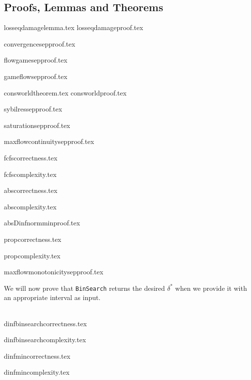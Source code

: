 \subsection{Proofs, Lemmas and Theorems}
  {losseqdamagelemma.tex}
  {losseqdamageproof.tex}

  {convergencesepproof.tex}

  {flowgamesepproof.tex}

  {gameflowsepproof.tex}

  {consworldtheorem.tex}
  {consworldproof.tex}

  {sybilressepproof.tex}

  {saturationsepproof.tex}

  {maxflowcontinuitysepproof.tex}

  {fcfscorrectness.tex}

  {fcfscomplexity.tex}

  {abscorrectness.tex}

  {abscomplexity.tex}

  {absDinfnormminproof.tex}

  {propcorrectness.tex}

  {propcomplexity.tex}

  {maxflowmonotonicitysepproof.tex}

  We will now prove that \texttt{BinSearch} returns the desired $\delta^*$ when we provide it with an appropriate interval as
  input.

  \ \\

  {dinfbinsearchcorrectness.tex}

  {dinfbinsearchcomplexity.tex}

  {dinfmincorrectness.tex}

  {dinfmincomplexity.tex}
